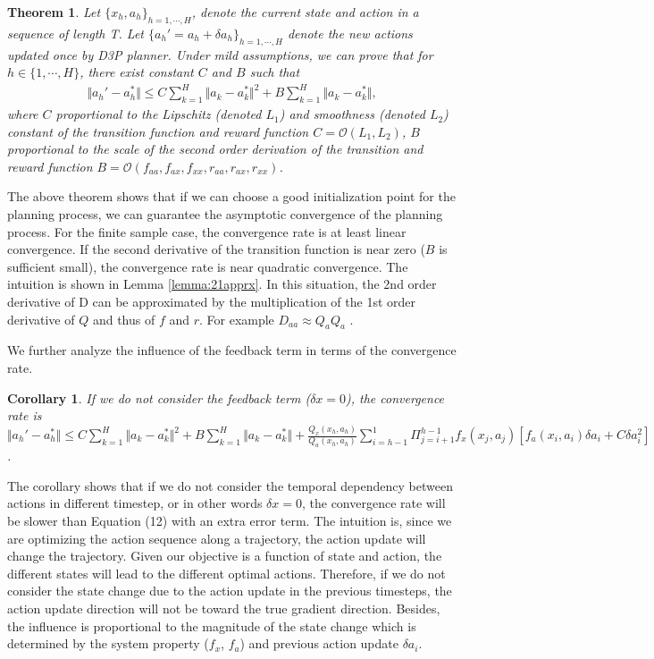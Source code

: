 \documentclass{article}
\newtheorem{theorem}{Theorem}
\newtheorem{corollary}{Corollary}
\newcommand{\yue}[1]{ {#1}}
\begin{document}
\begin{theorem}\label{thm:d3p}
Let $\{x_h,a_h\}_{h=1,\cdots, H}$, denote the current state and action in a sequence of length T. Let $ \{a_h' = a_h  + \delta a_h\}_{h=1,\cdots, H}$ denote the new actions updated once by D3P planner. Under mild assumptions, we can prove that for $h \in \{1, \cdots , H\}$, there exist constant $C$ and $B$ such that
\begin{align}
   \Vert a_h' - a_h^* \Vert  \le C  \sum_{k=1}^H\Vert a_k  -a_k^* \Vert^2  + B \sum_{k=1}^H\Vert a_k  -a_k^* \Vert ,
\end{align}
where $C$ proportional to  the Lipschitz (denoted $L_1$) and smoothness (denoted $L_2$) constant of the transition function and reward function $C =  \mathcal{O}(L_1, L_2) $, $B$ proportional to the scale of the second order derivation  of the transition and reward function $B = \mathcal{O} (f_{aa},f_{ax},f_{xx}, r_{aa},r_{ax},r_{xx} )$.
\end{theorem}
 
The above theorem shows that if we can choose a good initialization point for the planning process, we can guarantee the asymptotic convergence of the planning process. For the finite sample case, the convergence rate is at least   linear convergence. If the second derivative of the transition function is near zero ($B$ is sufficient small),  the convergence rate is near quadratic convergence. The intuition is shown in Lemma \ref{lemma:21apprx}. In this situation, the 2nd order derivative of D can be approximated by the multiplication of the 1st order derivative of $Q$ and thus of $f$ and $r$. For example  $D_{aa} \approx Q_aQ_a$ .
 
  We further analyze the influence of the feedback term in terms of the convergence rate.  
  
 \begin{corollary}\label{coro:feedback}
\yue{If we do not consider the feedback term ($\delta x = 0$)},  the convergence rate is {\small $\Vert a_h' - a_h^* \Vert  \le C \sum_{k=1}^H\Vert a_k  -a_k^* \Vert^2  + B \sum_{k=1}^H\Vert a_k  -a_k^* \Vert  + \frac{Q_x(x_h, a_h)}{Q_a(x_h, a_h)}\sum_{i=h-1}^1 \Pi_{j=i+1}^{h-1}f_x(x_j, a_j)\left[ f_a(x_i, a_i)\delta a_i  +C   \delta a_i  ^2 \right] $}.
\end{corollary}

\yue{The corollary shows that if we do not consider the temporal dependency between actions in different timestep, or in other words $\delta x=0$, the convergence rate will be slower than Equation (12) with an extra error term. }
 The intuition is, since we are optimizing the action sequence along a trajectory,  the action update will change the trajectory. Given our objective is  a function of state and action,  the different states will lead to the different optimal actions. Therefore, if we do not consider the state change due to the action update in the previous timesteps, the action update direction will not be toward  the true gradient direction. Besides, the influence is proportional to the magnitude of the state change which is determined by the system property ($f_x$, $f_a$) and previous action update $\delta a_i $. 
 
\end{document}
